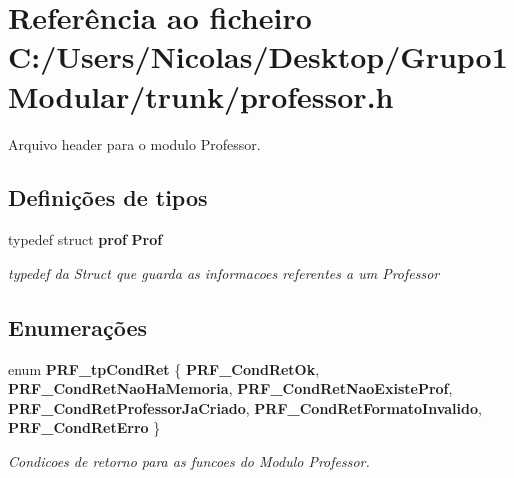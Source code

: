 \section{Referência ao ficheiro C\+:/\+Users/\+Nicolas/\+Desktop/\+Grupo1\+Modular/trunk/professor.h}
\label{professor_8h}


Arquivo header para o modulo Professor.  


\subsection*{Definições de tipos}
\begin{DoxyCompactItemize}
\item 
typedef struct \textbf{ prof} \textbf{ Prof}
\begin{DoxyCompactList}\small\item\em typedef da Struct que guarda as informacoes referentes a um Professor \end{DoxyCompactList}\end{DoxyCompactItemize}
\subsection*{Enumerações}
\begin{DoxyCompactItemize}
\item 
enum \textbf{ P\+R\+F\+\_\+tp\+Cond\+Ret} \{ \newline
\textbf{ P\+R\+F\+\_\+\+Cond\+Ret\+Ok}, 
\textbf{ P\+R\+F\+\_\+\+Cond\+Ret\+Nao\+Ha\+Memoria}, 
\textbf{ P\+R\+F\+\_\+\+Cond\+Ret\+Nao\+Existe\+Prof}, 
\textbf{ P\+R\+F\+\_\+\+Cond\+Ret\+Professor\+Ja\+Criado}, 
\newline
\textbf{ P\+R\+F\+\_\+\+Cond\+Ret\+Formato\+Invalido}, 
\textbf{ P\+R\+F\+\_\+\+Cond\+Ret\+Erro}
 \}\begin{DoxyCompactList}\small\item\em Condicoes de retorno para as funcoes do Modulo Professor. \end{DoxyCompactList}
\end{DoxyCompactItemize}
